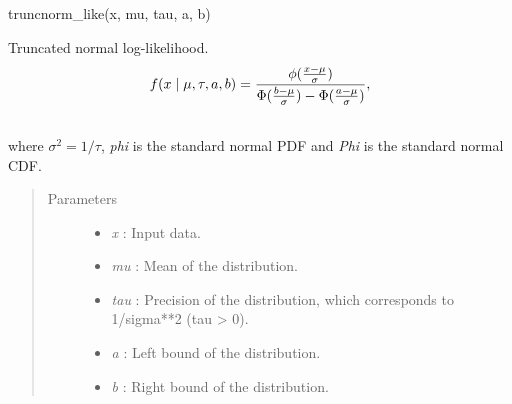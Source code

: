 \documentclass[letterpaper,10pt,english]{sphinxmanual}
\begin{document}
\begin{fulllineitems}
\label{distributions:pymc.distributions.truncated_normal_like}
truncnorm\_like(x, mu, tau, a, b)

Truncated normal log-likelihood.
\begin{gather}
\begin{split}f(x \mid \mu, \tau, a, b) = \frac{\phi(\frac{x-\mu}{\sigma})} {\Phi(\frac{b-\mu}{\sigma}) - \Phi(\frac{a-\mu}{\sigma})},\end{split}\notag\\\begin{split}\end{split}\notag
\end{gather}
where $\sigma^2=1/\tau$, \emph{phi} is the standard normal PDF and \emph{Phi} is the standard normal CDF.
\begin{quote}\begin{description}
\item[{Parameters }] \leavevmode\begin{itemize}
\item {} 
\emph{x} : Input data.

\item {} 
\emph{mu} : Mean of the distribution.

\item {} 
\emph{tau} : Precision of the distribution, which corresponds to 1/sigma**2 (tau \textgreater{} 0).

\item {} 
\emph{a} : Left bound of the distribution.

\item {} 
\emph{b} : Right bound of the distribution.

\end{itemize}

\end{description}\end{quote}

\end{fulllineitems}

\end{document}
